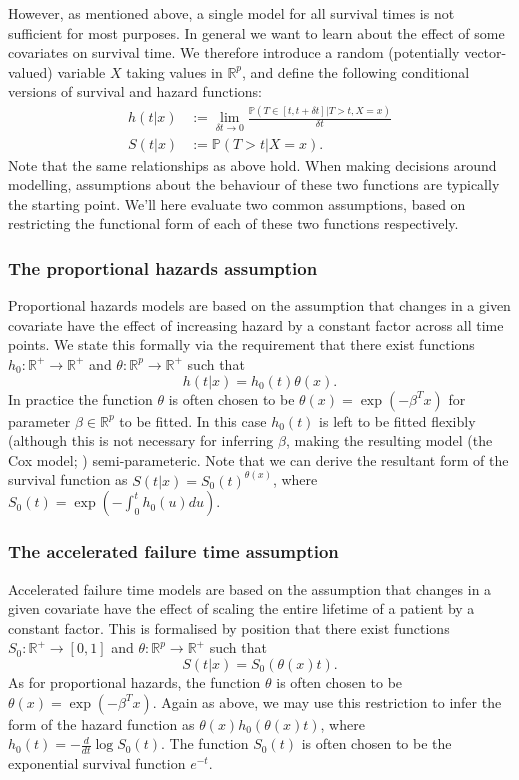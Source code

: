 \documentclass[../thesis.tex]{subfiles}
\begin{document}
However, as mentioned above, a single model for all survival times is not sufficient for most purposes. In general we want to learn about the effect of some covariates on survival time. We therefore introduce a random (potentially vector-valued) variable $X$ taking values in $\mathbb{R}^p$, and define the following conditional versions of survival and hazard functions:
\begin{align*}
    h(t|x) & := \lim_{\delta t \rightarrow 0} \frac{\mathbb{P}(T \in [t, t + \delta t] | T > t, X = x)}{\delta t} \\
    S(t|x) & := \mathbb{P}(T > t | X = x).
\end{align*}
Note that the same relationships as above hold. When making decisions around modelling, assumptions about the behaviour of these two functions are typically the starting point. We'll here evaluate two common assumptions, based on restricting the functional form of each of these two functions respectively.

\subsubsection{The proportional hazards assumption}
Proportional hazards models are based on the assumption that changes in a given covariate have the effect of increasing hazard by a constant factor across all time points. We state this formally via the requirement that there exist functions $h_0: \mathbb{R}^+ \rightarrow \mathbb{R}^+$ and $\theta: \mathbb{R}^p \rightarrow \mathbb{R}^+$ such that 
\[h(t|x) = h_0(t) \theta(x). \]
In practice the function $\theta$ is often chosen to be $\theta(x) = \exp (- \beta^T x)$ for parameter $\beta \in \mathbb{R}^p$ to be fitted. In this case $h_0(t)$ is left to be fitted flexibly (although this is not necessary for inferring $\beta$, making the resulting model (the Cox model; \citealp{cox_regression_1972}) semi-parameteric. Note that we can derive the resultant form of the survival function as $S(t|x) = S_0(t)^{\theta(x)}$, where $S_0(t) = \exp(-\int_{0}^{t}h_0(u)du)$.


\subsubsection{The accelerated failure time assumption}
Accelerated failure time models \citep{wei_accelerated_1992} are based on the assumption that changes in a given covariate have the effect of scaling the entire lifetime of a patient by a constant factor. This is formalised by position that there exist functions $S_0: \mathbb{R}^+ \rightarrow [0,1]$ and $\theta: \mathbb{R}^p \rightarrow \mathbb{R}^+$ such that 
\[S(t|x) = S_0(\theta(x)t).\]
As for proportional hazards, the function $\theta$ is often chosen to be $\theta(x) = \exp (-\beta^T x)$. Again as above, we may use this restriction to infer the form of the hazard function as $\theta(x)h_0(\theta(x)t)$, where $h_0(t) = -\frac{d}{dt} \log S_0(t)$. The function $S_0(t)$ is often chosen to be the exponential survival function $e^{-t}$.
\end{document}
